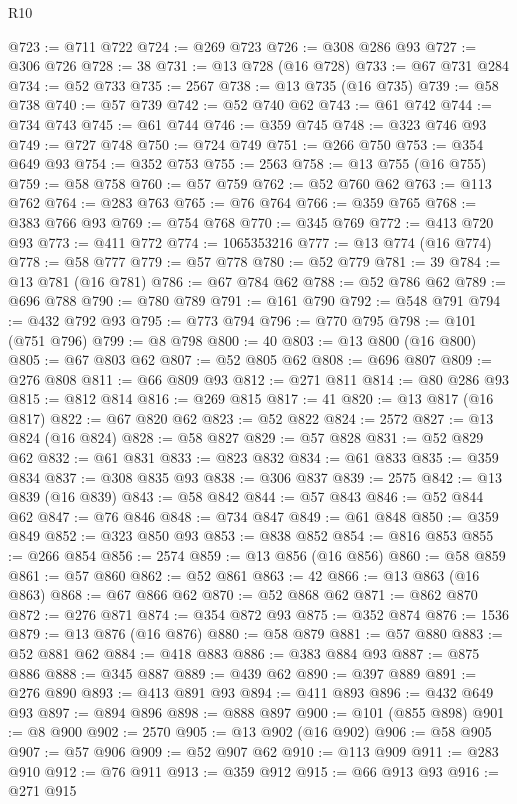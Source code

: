 \begin{lexlean}{R10}
\begin{coremodule}
@723 := @711 @722
@724 := @269 @723
@726 := @308 @286 @93
@727 := @306 @726
@728 := 38
@731 := @13 @728 (@16 @728)
@733 := @67 @731 @284
@734 := @52 @733
@735 := 2567
@738 := @13 @735 (@16 @735)
@739 := @58 @738
@740 := @57 @739
@742 := @52 @740 @62
@743 := @61 @742
@744 := @734 @743
@745 := @61 @744
@746 := @359 @745
@748 := @323 @746 @93
@749 := @727 @748
@750 := @724 @749
@751 := @266 @750
@753 := @354 @649 @93
@754 := @352 @753
@755 := 2563
@758 := @13 @755 (@16 @755)
@759 := @58 @758
@760 := @57 @759
@762 := @52 @760 @62
@763 := @113 @762
@764 := @283 @763
@765 := @76 @764
@766 := @359 @765
@768 := @383 @766 @93
@769 := @754 @768
@770 := @345 @769
@772 := @413 @720 @93
@773 := @411 @772
@774 := 1065353216
@777 := @13 @774 (@16 @774)
@778 := @58 @777
@779 := @57 @778
@780 := @52 @779
@781 := 39
@784 := @13 @781 (@16 @781)
@786 := @67 @784 @62
@788 := @52 @786 @62
@789 := @696 @788
@790 := @780 @789
@791 := @161 @790
@792 := @548 @791
@794 := @432 @792 @93
@795 := @773 @794
@796 := @770 @795
@798 := @101 (@751 @796)
@799 := @8 @798
@800 := 40
@803 := @13 @800 (@16 @800)
@805 := @67 @803 @62
@807 := @52 @805 @62
@808 := @696 @807
@809 := @276 @808
@811 := @66 @809 @93
@812 := @271 @811
@814 := @80 @286 @93
@815 := @812 @814
@816 := @269 @815
@817 := 41
@820 := @13 @817 (@16 @817)
@822 := @67 @820 @62
@823 := @52 @822
@824 := 2572
@827 := @13 @824 (@16 @824)
@828 := @58 @827
@829 := @57 @828
@831 := @52 @829 @62
@832 := @61 @831
@833 := @823 @832
@834 := @61 @833
@835 := @359 @834
@837 := @308 @835 @93
@838 := @306 @837
@839 := 2575
@842 := @13 @839 (@16 @839)
@843 := @58 @842
@844 := @57 @843
@846 := @52 @844 @62
@847 := @76 @846
@848 := @734 @847
@849 := @61 @848
@850 := @359 @849
@852 := @323 @850 @93
@853 := @838 @852
@854 := @816 @853
@855 := @266 @854
@856 := 2574
@859 := @13 @856 (@16 @856)
@860 := @58 @859
@861 := @57 @860
@862 := @52 @861
@863 := 42
@866 := @13 @863 (@16 @863)
@868 := @67 @866 @62
@870 := @52 @868 @62
@871 := @862 @870
@872 := @276 @871
@874 := @354 @872 @93
@875 := @352 @874
@876 := 1536
@879 := @13 @876 (@16 @876)
@880 := @58 @879
@881 := @57 @880
@883 := @52 @881 @62
@884 := @418 @883
@886 := @383 @884 @93
@887 := @875 @886
@888 := @345 @887
@889 := @439 @62
@890 := @397 @889
@891 := @276 @890
@893 := @413 @891 @93
@894 := @411 @893
@896 := @432 @649 @93
@897 := @894 @896
@898 := @888 @897
@900 := @101 (@855 @898)
@901 := @8 @900
@902 := 2570
@905 := @13 @902 (@16 @902)
@906 := @58 @905
@907 := @57 @906
@909 := @52 @907 @62
@910 := @113 @909
@911 := @283 @910
@912 := @76 @911
@913 := @359 @912
@915 := @66 @913 @93
@916 := @271 @915

\end{coremodule}
\end{lexlean}
